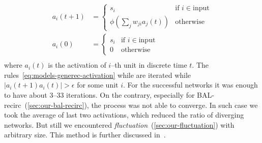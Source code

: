 \begin{align}
  \label{eq:models-generec-activation}
  a_i(t+1) &= \left\{
	\begin{array}{ll}
		s_i & \mbox{if } i \in \mbox{input} \nonumber \\
		\phi(\sum_j w_{ji}a_j(t)) & \mbox{otherwise} \nonumber 
	\end{array}
\right. \\
  a_i(0) &= \left\{
	\begin{array}{ll}
		s_i & \mbox{if } i \in \mbox{input} \nonumber \\
		0 & \mbox{otherwise} \nonumber 
	\end{array}
\right. \\
\end{align} 
\label{sec:generec-fluctuation}
where $a_i(t)$ is the activation of $i$--th unit in discrete time $t$. The rules~\ref{eq:models-generec-activation} while are iterated while $|a_i(t+1) a_i(t)| > \epsilon$ for some unit $i$. For the successful networks it was enough to have about 3--33 iterations. On the contrary, especially for BAL-recirc~(\ref{sec:our-bal-recirc}), the process was not able to converge. In such case we took the average of last two activations, which reduced the ratio of diverging networks. But still we encountered \emph{fluctuation}~(\ref{sec:our-fluctuation}) with arbitrary size. This method is further discussed in~\citet{orru2008sabio}.

